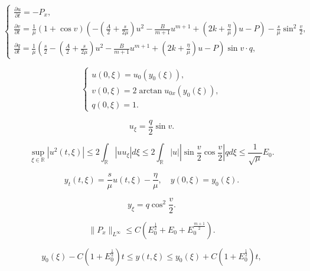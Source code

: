 \documentclass[10pt,a4paper]{amsart}
\begin{document}
	\begin{equation}\label{semi-linear system}
		\left\{
		\begin{array}{l}
			\frac{\partial u}{\partial t}=-P_x,\\
			\frac{\partial v}{\partial t}=\frac{1}{\mu}(1+\cos v)\left(-\left(\frac A2+\frac{s}{2\mu}\right)u^2-\frac{B}{m+1}u^{m+1}+\left(2k+\frac{\eta}{\mu}\right)u-P\right)-\frac{s}{\mu}\sin^2\frac{v}{2},\\
			\frac{\partial q}{\partial t}=\frac{1}{\mu}\left(\frac{s}{2}-\left(\frac A2+\frac{s}{2\mu}\right)u^2-\frac{B}{m+1}u^{m+1}+\left(2k+\frac{\eta}{\mu}\right)u-P\right)\sin v\cdot q,
		\end{array}\right.
	\end{equation}

	\begin{equation}\label{semi-linear system_initial data}
		\left\{
		\begin{array}{l}
			u(0,\xi)=u_0\left(y_0(\xi)\right), \\
			v(0,\xi)=2\arctan u_{0x}\left(y_0(\xi)\right), \\
			q(0,\xi)=1.
		\end{array}\right.
	\end{equation}

		\begin{equation}\label{u_xi}
			u_\xi=\frac{q}{2}\sin v.
		\end{equation}

		\begin{equation}\label{bdd_u}
			\sup_{\xi\in\mathbb{R}}|u^{2}(t,\xi)| \leq 2\int_\mathbb{R}|uu_\xi|d\xi  \leq2\int_\mathbb{R}|u||\sin\frac{v}{2}\cos\frac{v}{2}|qd\xi\leq \frac{1}{\sqrt{\mu}}E_0.
		\end{equation}

		\begin{equation}\label{partial_t y(t,xi)}
			y_t(t,\xi)=\frac{s}{\mu}u(t,\xi)-\frac{\eta}{\mu},\quad y(0,\xi)=y_0(\xi).
		\end{equation}

		\begin{equation}\label{y_xi}
			y_\xi=q\cos^2\frac{v}{2}.
		\end{equation}

		\begin{equation}\label{bdd_Px_Linfty}
			\|P_x\|_{L^\infty}\leq C\left(E_0^{\frac{1}{2}}+E_0+E_0^{\frac{m+1}{2}}\right).
		\end{equation}

		\begin{equation}\label{bdd_y(t,xi)}
			y_0(\xi)-C\left(1+E_0^{\frac{1}{2}}\right)t\leq y(t,\xi)\leq y_0(\xi)+C\left(1+E_0^{\frac{1}{2}}\right)t,
		\end{equation}
\end{document}
